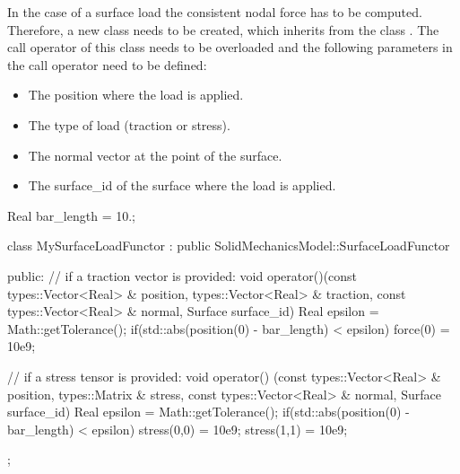 In  the  case  of  a  surface   load  the  consistent  nodal  force  has  to  be
computed.  Therefore,  a  new  class    needs  to  be
created,  which inherits  from  the class  . The  call
operator of  this class needs to  be overloaded and the  following parameters in
the call operator need to be defined:
\begin{itemize}
\item The position where the load is applied.
\item The type of load (traction or stress).
\item The normal vector at the point of the surface.
\item The surface\_id of the surface where the load is applied.
\end{itemize}
\begin{cpp}
  Real bar_length = 10.;

  class MySurfaceLoadFunctor : public SolidMechanicsModel::SurfaceLoadFunctor {
    public:
    // if a traction vector is provided:
    void operator()(const types::Vector<Real> & position,
    types::Vector<Real> & traction,
    const types::Vector<Real> & normal,
    Surface surface_id) {
      Real epsilon = Math::getTolerance();
      if(std::abs(position(0) - bar_length) < epsilon) {
	force(0) = 10e9;
      }
    }

    // if a stress tensor is provided:
    void operator() (const types::Vector<Real> & position,
    types::Matrix & stress,
    const types::Vector<Real> & normal,
    Surface surface_id) {
      Real epsilon = Math::getTolerance();
      if(std::abs(position(0) - bar_length) < epsilon) {
	stress(0,0) = 10e9;
	stress(1,1) = 10e9;
      }
    }
  };
\end{cpp}


